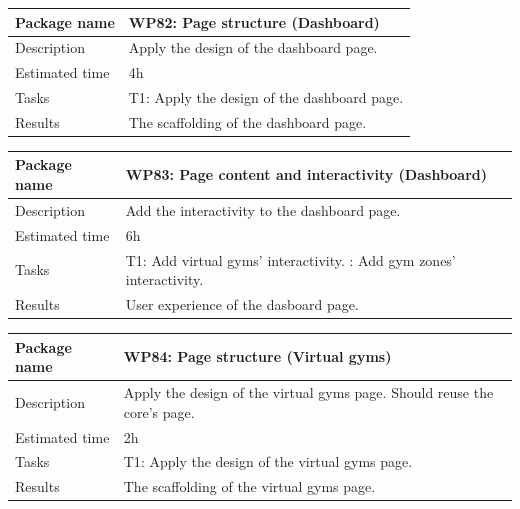 \documentclass[a4paper, 12pt, oneside]{book}
\begin{document}
\vspace*{16pt}
\begin{tabularx}{\textwidth}{| l | X |}
	\hline
	\rowcolor{rowColor}
	{\semibf Package name}   & {\semibf WP82}: Page structure (Dashboard)            \\
	\hline
	{\semibf Description}    & Apply the design of the dashboard page.               \\
	\hline
	\rowcolor{rowColor}
	{\semibf Estimated time} & 4h                                                    \\
	\hline
	{\semibf Tasks}          & {\semibf T1}: Apply the design of the dashboard page. \\
	\hline
	\rowcolor{rowColor}
	{\semibf Results}        & The scaffolding of the dashboard page.                \\
	\hline
\end{tabularx}
\vspace*{16pt}
\begin{tabularx}{\textwidth}{| l | X |}
	\hline
	\rowcolor{rowColor}
	{\semibf Package name}   & {\semibf WP83}: Page content and interactivity (Dashboard) \\
	\hline
	{\semibf Description}    & Add the interactivity to the dashboard page.               \\
	\hline
	\rowcolor{rowColor}
	{\semibf Estimated time} & 6h                                                         \\
	\hline
	{\semibf Tasks}          & {\semibf T1}: Add virtual gyms' interactivity.
	\newline {\semibf T2}: Add gym zones' interactivity.                                  \\
	\hline
	\rowcolor{rowColor}
	{\semibf Results}        & User experience of the dasboard page.                      \\
	\hline
\end{tabularx}
\vspace*{16pt}
\begin{tabularx}{\textwidth}{| l | X |}
	\hline
	\rowcolor{rowColor}
	{\semibf Package name}   & {\semibf WP84}: Page structure (Virtual gyms)                            \\
	\hline
	{\semibf Description}    & Apply the design of the virtual gyms page. Should reuse the core's page. \\
	\hline
	\rowcolor{rowColor}
	{\semibf Estimated time} & 2h                                                                       \\
	\hline
	{\semibf Tasks}          & {\semibf T1}: Apply the design of the virtual gyms page.                 \\
	\hline
	\rowcolor{rowColor}
	{\semibf Results}        & The scaffolding of the virtual gyms page.                                \\
	\hline
\end{tabularx}
\end{document}
